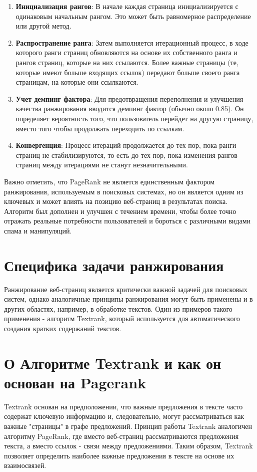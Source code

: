 \documentclass[a4paper]{article}
\begin{document}
\begin{enumerate}
	\item \textbf{Инициализация рангов}: В начале каждая страница инициализируется с одинаковым начальным рангом. Это может быть равномерное распределение или другой метод.
	\item \textbf{Распространение ранга}: Затем выполняется итерационный процесс, в ходе которого ранги страниц обновляются на основе их собственного ранга и рангов страниц, которые на них ссылаются. Более важные страницы (те, которые имеют больше входящих ссылок) передают больше своего ранга страницам, на которые они ссылкаются.
	\item \textbf{Учет демпинг фактора}: Для предотвращения переполнения и улучшения качества ранжирования вводится демпинг фактор (обычно около 0.85). Он определяет вероятность того, что пользователь перейдет на другую страницу, вместо того чтобы продолжать переходить по ссылкам.
	\item \textbf{Конвергенция}: Процесс итераций продолжается до тех пор, пока ранги страниц не стабилизируются, то есть до тех пор, пока изменения рангов страниц между итерациями не станут незначительными.
\end{enumerate}

Важно отметить, что PageRank не является единственным фактором ранжирования, используемым в поисковых системах, но он является одним из ключевых и может влиять на позицию веб-страниц в результатах поиска. Алгоритм был дополнен и улучшен с течением времени, чтобы более точно отражать реальные потребности пользователей и бороться с различными видами спама и манипуляций.

	
\section{Специфика задачи ранжирования}

Ранжирование веб-страниц является критически важной задачей для поисковых систем, однако аналогичные принципы ранжирования могут быть применены и в других областях, например, в обработке текстов. Один из примеров такого применения - алгоритм Textrank, который используется для автоматического создания кратких содержаний текстов.

\section{О Алгоритме Textrank и как он основан на Pagerank}

Textrank основан на предположении, что важные предложения в тексте часто содержат ключевую информацию и, следовательно, могут рассматриваться как важные "страницы" в графе предложений. Принцип работы Textrank аналогичен алгоритму PageRank, где вместо веб-страниц рассматриваются предложения текста, а вместо ссылок - связи между предложениями. Таким образом, Textrank позволяет определить наиболее важные предложения в тексте на основе их взаимосвязей.
\end{document}
